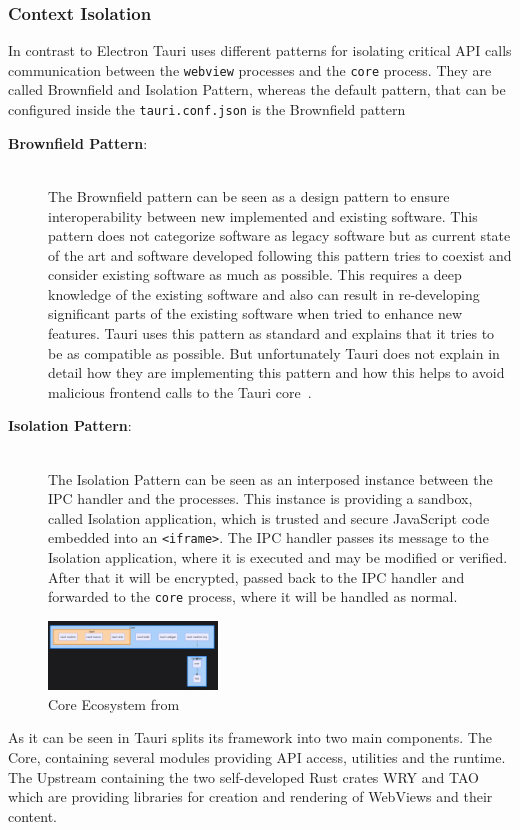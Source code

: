 \subsubsection{Context Isolation}
In contrast to Electron Tauri uses different patterns for isolating critical \ac{API} calls communication between the \texttt{webview} processes and the \texttt{core} process.
They are called Brownfield and Isolation Pattern, whereas the default pattern, that can be configured inside the \texttt{tauri.conf.json} is the Brownfield pattern
\begin{description}
    \item[\textbf{Brownfield Pattern}:] \hfill \\
    The Brownfield pattern can be seen as a design pattern to ensure interoperability between new implemented and existing software.
    This pattern does not categorize software as legacy software but as current state of the art and software developed following this pattern tries to coexist and consider existing software as much as possible.
    This requires a deep knowledge of the existing software and also can result in re-developing significant parts of the existing software when tried to enhance new features.
    Tauri uses this pattern as standard and explains that it tries to be as compatible as possible.
    But unfortunately Tauri does not explain in detail how they are implementing this pattern and how this helps to avoid malicious frontend calls to the Tauri core~\cite{tauri}.
    \item[\textbf{Isolation Pattern}:] \hfill \\
    The Isolation Pattern can be seen as an interposed instance between the \ac{IPC} handler and the processes.
    This instance is providing a sandbox, called Isolation application, which is trusted and secure JavaScript code embedded into an \texttt{<iframe>}.
    The \ac{IPC} handler passes its message to the Isolation application, where it is executed and may be modified or verified.
    After that it will be encrypted, passed back to the \ac{IPC} handler and forwarded to the \texttt{core} process, where it will be handled as normal.


\end{description}

\begin{figure}[ht]
    \centering
    \includegraphics[width=0.4\textwidth]{images/TauriCore}
    \caption{Core Ecosystem from~\cite{tauri}}
    \label{fig:tauri:core}
\end{figure}
As it can be seen in  Tauri splits its framework into two main components.
The Core, containing several modules providing API access, utilities and the runtime.
The Upstream containing the two self-developed Rust crates WRY and TAO which are providing libraries for creation and rendering of WebViews and their content.

